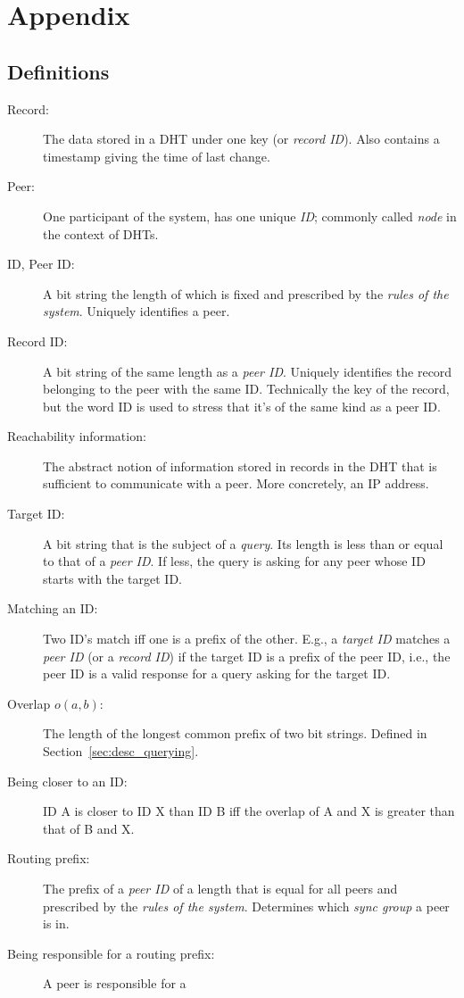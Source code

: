 \chapter{Appendix}
\section{Definitions}
\begin{description}
\item[Record:] The data stored in a \ac{DHT} under one key (or \emph{record
ID}). Also contains a timestamp giving the time of last change.
\item[Peer:] One participant of the system, has one unique \emph{ID}; commonly
called \emph{node} in the context of \acp{DHT}.
\item[ID, Peer ID:] A bit string the length of which is fixed and prescribed by
the \emph{rules of the system}. Uniquely identifies a peer.
\item[Record ID:] A bit string of the same length as a \emph{peer ID}. Uniquely
identifies the record belonging to the peer with the same ID. Technically the
key of the record, but the word ID is used to stress that it's of the same kind
as a peer ID.
\item[Reachability information:] The abstract notion of information stored in
records in the \ac{DHT} that is sufficient to communicate with a peer. More
concretely, an IP address.
\item[Target ID:] A bit string that is the subject of a \emph{query}. Its length
is less than or equal to that of a \emph{peer ID}. If less, the query is asking
for any peer whose ID starts with the target ID.
\item[Matching an ID:] Two ID's match iff one is a prefix of the other. E.g., a
\emph{target ID} matches a \emph{peer ID} (or a \emph{record ID}) if the target
ID is a prefix of the peer ID, i.e., the peer ID is a valid response for a query
asking for the target ID.
\item[Overlap $o(a, b)$:] The length of the longest common prefix of two bit
strings. Defined in Section~\ref{sec:desc_querying}.
\item[Being closer to an ID:] ID A is closer to ID X than ID B iff the overlap
of A and X is greater than that of B and X.
\item[Routing prefix:] The prefix of a \emph{peer ID} of a length that is equal
for all peers and prescribed by the \emph{rules of the system}. Determines which
\emph{sync group} a peer is in.
\item[Being responsible for a routing prefix:] A peer is responsible for a

\end{description}
